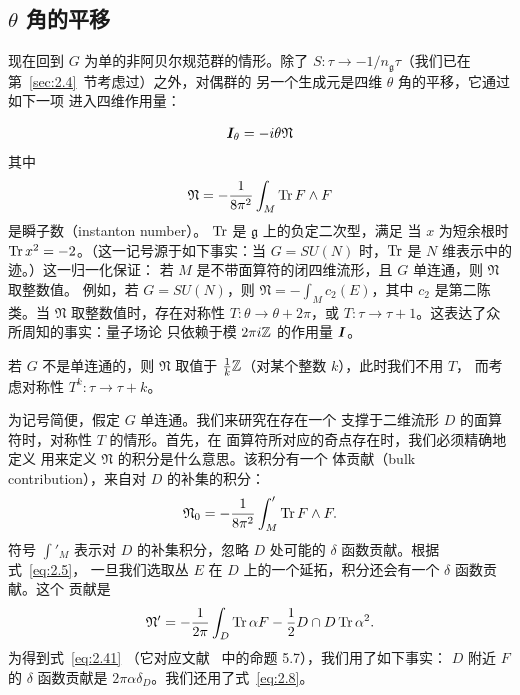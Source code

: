 \subsection{\texorpdfstring{$\theta$ 角的平移}{θ 角的平移}}
\label{sec:2.5}

现在回到 $G$ 为单的非阿贝尔规范群的情形。除了
$S:\tau\to -1/n_{\mathfrak g}\tau$（我们已在第~\ref{sec:2.4}~节考虑过）之外，对偶群的
另一个生成元是四维 $\theta$ 角的平移，它通过如下一项
进入四维作用量：

\setcounter{equation}{37}
\begin{equation}\label{eq:2.38}
  \bm{I}_\theta=-i\theta {\mathfrak{N}}
\end{equation}
 其中
\setcounter{equation}{38}
\begin{equation}\label{eq:2.39}
  {\mathfrak{N}}=-{1\over 8\pi^2}\int_M {\rm Tr}\,F\wedge F
\end{equation}
 是瞬子数（instanton number）。
${\rm Tr}$ 是 $\mathfrak g$ 上的负定二次型，满足
当 $x$ 为短余根时 ${\rm Tr}\, x^2=-2$。（这一记号源于如下事实：当 $G=SU(N)$ 时，${\rm Tr}$ 是
$N$ 维表示中的迹。）这一归一化保证：
若 $M$ 是不带面算符的闭四维流形，且 $G$ 单连通，则 ${\mathfrak{N}}$ 取整数值。
例如，若 $G=SU(N)$，则 ${\mathfrak{N}}
=-\int_Mc_2(E)$，其中 $c_2$ 是第二陈类。当 ${\mathfrak{N}}$
取整数值时，存在对称性 $T:\theta\to \theta+2\pi$，或
$T:\tau\to\tau+1$。这表达了众所周知的事实：量子场论
只依赖于模 $2\pi i{\mathbb{Z}}$ 的作用量 $\bm{I}$。

若 $G$ 不是单连通的，则 ${\mathfrak{N}}$ 取值于
${{1\over k}}{\mathbb{Z}}$（对某个整数 $k$），此时我们不用 $T$，
而考虑对称性 $T^k:\tau\to\tau+k$。

为记号简便，假定 $G$ 单连通。我们来研究在存在一个
支撑于二维流形 $D$ 的面算符时，对称性 $T$ 的情形。首先，在
面算符所对应的奇点存在时，我们必须精确地定义
用来定义 ${\mathfrak{N}}$ 的积分是什么意思。该积分有一个
体贡献（bulk contribution），来自对 $D$ 的补集的积分：
\setcounter{equation}{39}
\begin{equation}\label{eq:2.40}
  {\mathfrak{N}}_0=-{1\over 8\pi^2}\int'_M{\rm Tr}\,F\wedge F.
\end{equation}
 符号 $\int'_M$
表示对 $D$ 的补集积分，忽略 $D$ 处可能的 $\delta$ 函数贡献。根据式~\eqref{eq:2.5}，
一旦我们选取丛 $E$ 在 $D$ 上的一个延拓，积分还会有一个 $\delta$ 函数贡献。这个
贡献是
\setcounter{equation}{40}
\begin{equation}\label{eq:2.41}
  {\mathfrak{N}}'=-{1\over 2\pi}\int_D {\rm Tr}
\,\alpha F-{1\over 2}D\cap D\,{\rm Tr}\,\alpha^2 .
\end{equation}
  为得到式~\eqref{eq:2.41}
（它对应文献~\cite{ref11} 中的命题 5.7），我们用了如下事实：
$D$ 附近 $F$ 的 $\delta$ 函数贡献是
$2\pi\alpha\delta_D$。我们还用了式~\eqref{eq:2.8}。

